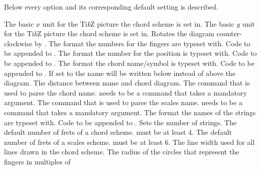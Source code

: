 \documentclass[load-preamble+]{cnltx-doc}
\newcommand*\TikZ{Ti\textit{k}Z}
\begin{document}
Below every option and its corresponding default setting is described.
\begin{options}
  \Default{.8cm}
    The basic $x$ unit for the \TikZ{} picture the chord scheme is set in.
  \Default{.8cm}
    The basic $y$ unit for the \TikZ{} picture the chord scheme is set in.
    Rotates the diagram counter-clockwise by .
    The format the numbers for the fingers are typeset with.
  \Default
    Code to be appended to .
    The format the number for the position is typeset with.
  \Default
    Code to be appended to .
    The format the chord name/symbol is typeset with.
  \Default
    Code to be appended to .
    If set to  the name will be written below
    instead of above the diagram.
  \Default{.5em}
    The distance between name and chord diagram.
    The command that is used to parse the chord name.
     needs to be a command that takes a mandatory argument.
    The command that is used to parse the scales name.
     needs to be a command that takes a mandatory argument.
    The format the names of the strings are typeset with.
  \Default
    Code to be appended to .
    Sets the number of strings.
    The default number of frets of a chord scheme.
     must be at least 4. 
    The default number of frets of a scales scheme.
     must be at least 6.
  \Default{1pt}
    The line width used for all lines drawn in the chord scheme.
    The radius of the circles that represent the fingers in multiples of

\end{options}
\end{document}
